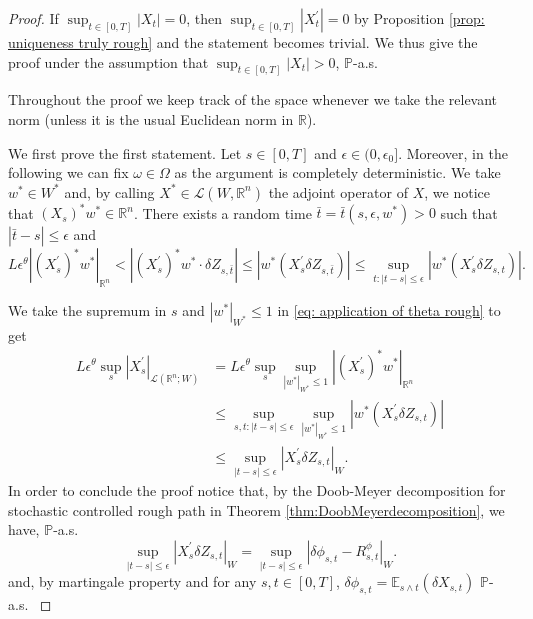 \documentclass[11pt,a4paper]{article}
\newcommand{\R}{\mathbb{R}}
\newcommand{\E}{\mathbb{E}}
\theoremstyle{plain}
\begin{document}
\begin{proof}
If $\sup_{t\in[0,T]}|X_t| = 0$, then $\sup_{t\in [0,T]} |X_t^{\prime}| = 0$ by Proposition \ref{prop: uniqueness truly rough} and the statement becomes trivial. We thus give the proof under the assumption that $\sup_{t\in[0,T]}|X_t|>0$, $\mathbb{P}$-a.s.

Throughout the proof we keep track of the space whenever we take the relevant norm (unless it is the usual Euclidean norm in $\R$).

    We first prove the first statement.
    Let $s\in [0,T]$ and $\epsilon \in (0,\epsilon_0]$. Moreover, in the following we can fix $\omega \in \Omega$ as the argument is completely deterministic. We take $w^{\ast} \in W^{\ast}$ and, by calling $X^{\ast} \in \mathscr{L}(W,\R^n)$ the adjoint operator of $X$, we notice that $(X_s)^{\ast}w^{\ast} \in \R^n$. There exists a random time $\bar{t} = \bar{t}(s,\epsilon,w^\ast) > 0$ such that $|\bar{t}-s| \leq \epsilon$ and
    \begin{equation}
    \label{eq: application of theta rough}
     L \epsilon^{\theta}|(X^\prime_s)^{\ast}w^{\ast}|_{\R^n}
     < |(X^\prime_s)^{\ast}w^{\ast}\cdot \delta Z_{s,\bar{t}}| 
     \leq 
     |w^{\ast}(X^\prime_s \delta Z_{s,\bar{t}})|
     \leq \sup_{t: |t-s|\leq \epsilon} |w^{\ast}(X^\prime_s \delta Z_{s,t})|.
    \end{equation}
    
    We take the supremum in $s$ and $|w^{\ast}|_{W^{\ast}} \leq 1$ in \eqref{eq: application of theta rough} to get 
    \begin{align*}
        L \epsilon^{\theta} \sup_s |X^{\prime}_s|_{\mathscr{L}(\R^n;W)}
        & = L \epsilon^{\theta} \sup_s \sup_{|w^{\ast}|_{W^{\ast}} \leq 1}|(X^{\prime}_s)^{\ast}w^{\ast}|_{\R^n} \\
        & \leq %
        \sup_{s,t: |t-s|\leq \epsilon}\sup_{|w^{\ast}|_{W^{\ast}} \leq 1}|w^{\ast}(X^\prime_s \delta  Z_{s,t})|\\
        & \leq 
        \sup_{|t-s|\leq \epsilon} |X^\prime_s \delta Z_{s,t}|_W.
    \end{align*}
    In order to conclude the proof notice that, by { the Doob-Meyer decomposition for stochastic controlled rough path in Theorem \ref{thm:DoobMeyerdecomposition}}, we have, $\mathbb{P}$-a.s.
    \begin{equation*}
        \sup_{|t-s|\leq \epsilon} |X^\prime_s \delta Z_{s,t}|_W
        = \sup_{|t-s|\leq \epsilon}
          |
            \delta \phi_{s,t} - R^\phi_{s,t}
        |_W.
    \end{equation*}
    { and, by martingale property and for any $s,t \in [0,T]$, $\delta \phi_{s,t} = \E_{s \wedge t} (\delta X_{s,t})$ $\mathbb{P}$-a.s. }


\end{proof}
\end{document}
